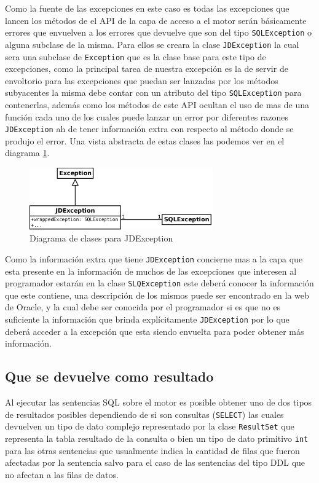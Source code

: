 Como la fuente de las excepciones en este caso es \jd todas las excepciones que lancen los métodos de el API de la capa de acceso a el motor serán básicamente errores que envuelven a los  errores que devuelve \jd que son del tipo \verb=SQLException= o alguna subclase de la misma. Para ellos se creara la clase \verb=JDException= la cual sera una subclase de \verb=Exception= que es la clase base para este tipo de excepciones, como la principal tarea de nuestra excepción es la de servir de envoltorio para las excepciones que puedan ser lanzadas por los métodos subyacentes la misma debe contar con un atributo del tipo \verb=SQLException= para contenerlas, además como los métodos de este API ocultan el uso de mas de una función cada uno de los cuales puede lanzar un error por diferentes razones \verb=JDException= ah de tener información extra con respecto al método donde se produjo el error. Una vista abstracta de estas clases las podemos ver en el diagrama \ref{fig:jdbgm-exception}.
%
\begin{figure}
  \centering
    \includegraphics[width=0.7\textwidth]{figuras/jdbgm-exception.png}
  \caption{Diagrama de clases para JDException}
  \label{fig:jdbgm-exception}
\end{figure}

Como la información extra que tiene \verb=JDException= concierne mas a la capa que esta presente en \jj la información de muchos de las excepciones que interesen al programador estarán en la clase \verb=SLQException= este deberá conocer la información que este contiene, una descripción de los mismos puede ser encontrado en la web de Oracle\citep{java:exeptions}, y la cual debe ser conocida por el programador si es que no es suficiente la información que brinda explícitamente \verb=JDException= por lo que deberá acceder a la excepción que esta siendo envuelta para poder obtener más información.
%
\subsection{Que se devuelve como resultado}
Al ejecutar las sentencias SQL sobre el motor es posible obtener uno de dos tipos de resultados posibles dependiendo de si son consultas (\verb=SELECT=) las cuales devuelven un tipo de dato complejo representado por la clase \verb=ResultSet= que representa la tabla resultado de la consulta o bien un tipo de dato primitivo \verb=int= para las otras sentencias que usualmente indica la cantidad de filas que fueron afectadas por la sentencia salvo para el caso de las sentencias del tipo DDL que no afectan a las filas de datos.

